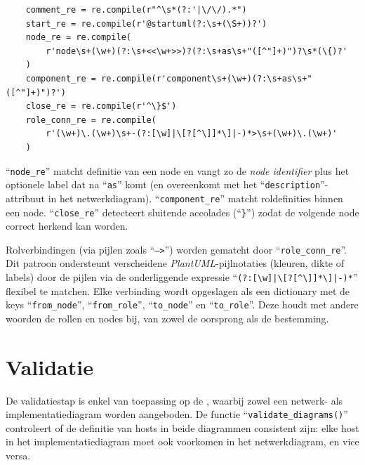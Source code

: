 \begin{codeblockfixed}
  \begin{codeblock}
    \begin{verbatim}
    comment_re = re.compile(r"^\s*(?:'|\/\/).*")
    start_re = re.compile(r'@startuml(?:\s+(\S+))?')
    node_re = re.compile(
        r'node\s+(\w+)(?:\s+<<\w+>>)?(?:\s+as\s+"([^"]+)")?\s*(\{)?'
    )
    component_re = re.compile(r'component\s+(\w+)(?:\s+as\s+"([^"]+)")?')
    close_re = re.compile(r'^\}$')
    role_conn_re = re.compile(
        r'(\w+)\.(\w+)\s+-(?:[\w]|\[?[^\]]*\]|-)*>\s+(\w+)\.(\w+)'
    )
\end{verbatim}
    \caption[Reguliere expressies voor ``\texttt{parse\_uml()}'']{Reguliere expressies voor de parsering van het implementatiediagram.}
    \label{code:regex_uml}
  \end{codeblock}
\end{codeblockfixed}

``\texttt{node\_re}'' matcht definitie van een node en vangt zo de \emph{node identifier} plus het optionele label dat na ``\texttt{as}'' komt (en overeenkomt met het ``\texttt{description}''-attribuut in het netwerkdiagram).
``\texttt{component\_re}'' matcht roldefinities binnen een node.
``\texttt{close\_re}'' detecteert sluitende accolades (``\texttt{\}}'') zodat de volgende node correct herkend kan worden.

Rolverbindingen (via pijlen zoals ``\texttt{-->}'') worden gematcht door ``\texttt{role\_conn\_re}''. Dit patroon ondersteunt verscheidene \emph{PlantUML}-pijlnotaties (kleuren, dikte of labels) door de pijlen via de onderliggende expressie ``\verb!(?:[\w]|\[?[^\]]*\]|-)*!'' flexibel te matchen.
Elke verbinding wordt opgeslagen als een dictionary met de keys ``\texttt{from\_node}'', ``\texttt{from\_role}'', ``\texttt{to\_node}'' en ``\texttt{to\_role}''. Deze houdt met andere woorden de rollen en nodes bij, van zowel de oorsprong als de bestemming.

\section{Validatie}%
\label{sec:validatie}

De validatiestap is enkel van toepassing op de , waarbij zowel een netwerk- als implementatiediagram worden aangeboden. De functie ``\texttt{validate\_diagrams()}'' controleert of de definitie van hosts in beide diagrammen consistent zijn: elke host in het implementatiediagram moet ook voorkomen in het netwerkdiagram, en vice versa.

